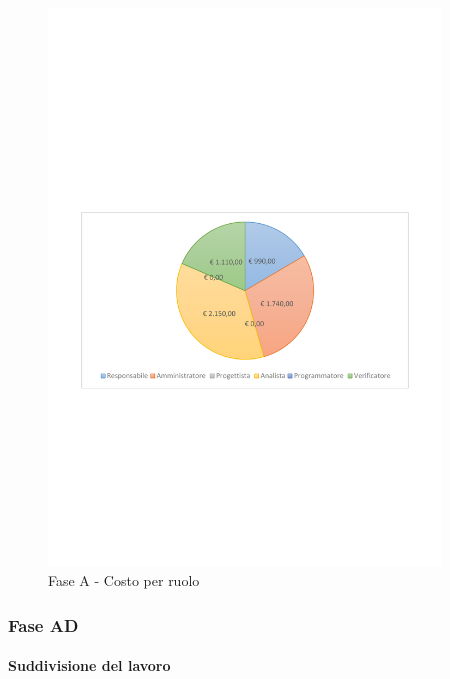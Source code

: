 \documentclass[../PianoProgetto.tex]{subfiles}
\begin{document}
	\begin{figure}[!h]
		\centering
		\includegraphics[width=0.93\textwidth , trim=2cm 9.5cm 2cm 11cm]{grafici/A/A-costo}
			\caption{Fase A - Costo per ruolo}
		\label{fig:CircleChart-faseA_costo}
	\end{figure}
\vfill
	
	\subsubsection{Fase AD}
				\paragraph{Suddivisione del lavoro}
				
\end{document}
